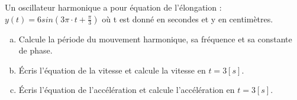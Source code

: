 %
%
    Un oscillateur harmonique a pour équation de l'élongation : \(y(t)=6sin(3 \pi \cdot t + \frac{\pi}{3})\) où t est donné en secondes et y en centimètres.
    \begin{enumerate}[a)]
        \item Calcule la période du mouvement harmonique, sa fréquence et sa constante de phase.
        \item Écris l'équation de la vitesse et calcule la vitesse en \(t=3[s]\).
        \item Écris l'équation de l'accélération et calcule l'accélération en \(t=3[s]\).
    \end{enumerate}
